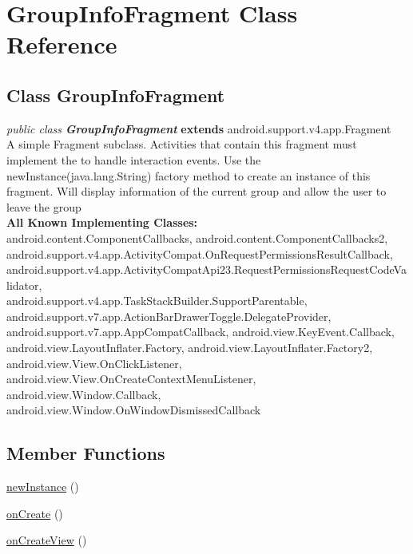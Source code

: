 \hypertarget{class_GroupInfoFragment.Android}{\section{GroupInfoFragment Class Reference}
\label{class_GroupInfoFragment.Android}
}

\subsection*{Class GroupInfoFragment}

\textit{public class \textbf{GroupInfoFragment}}
\textbf{extends} android.support.v4.app.Fragment\\

A simple Fragment subclass. Activities that contain this fragment must implement the to handle interaction events. Use the newInstance(java.lang.String) factory method to create an instance of this fragment. Will display information of the current group and allow the user to leave the group\\


\textbf{All Known Implementing Classes:}\\
\tab            android.content.ComponentCallbacks, android.content.ComponentCallbacks2,\\
android.support.v4.app.ActivityCompat.OnRequestPermissionsResultCallback, \\
android.support.v4.app.ActivityCompatApi23.RequestPermissionsRequestCodeValidator,\\
 android.support.v4.app.TaskStackBuilder.SupportParentable,\\
  android.support.v7.app.ActionBarDrawerToggle.DelegateProvider,\\
  android.support.v7.app.AppCompatCallback, android.view.KeyEvent.Callback, \\
  android.view.LayoutInflater.Factory, android.view.LayoutInflater.Factory2, \\
  android.view.View.OnClickListener, android.view.View.OnCreateContextMenuListener,\\
    android.view.Window.Callback, android.view.Window.OnWindowDismissedCallback\\



\subsection*{Member Functions}
\begin{DoxyCompactItemize}
\item 
\hyperlink{class_GroupInfoFragment.Android.newInstance}{newInstance} ()
\item 
\hyperlink{class_GroupInfoFragment.Android.onCreate}{onCreate} ()
\item 
\hyperlink{class_GroupInfoFragment.Android.onCreateView}{onCreateView} ()

\end{DoxyCompactItemize}




